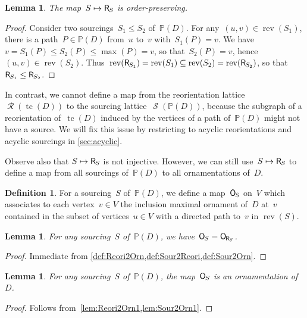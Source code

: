 \documentclass{amsart}
\newtheorem{lemma}[theorem]{Lemma}
\theoremstyle{definition}
\newtheorem{definition}[theorem]{Definition}
\renewcommand{\c}[1]{\mathcal{#1}} %
\DeclareMathOperator{\tc}{tc} %
\newcommand{\mymap}[2]{\mathsf{#1}_{\hspace{-.7pt}#2}}
\newcommand{\orn}[1]{\mymap{O}{#1}}  %
\DeclareMathOperator{\Reori}{\c{R}}  %
\newcommand{\reori}[1]{\mymap{R}{#1}}  %
\DeclareMathOperator{\rev}{rev} %
\DeclareMathOperator{\Sour}{\mathcal{S}}  %
\newcommand{\PP}{\mathbb P} %
\begin{document}
\begin{lemma}
\label{lem:Sour2Reori}
The map~$S \mapsto \reori{S}$ is order-preserving.
\end{lemma}

\begin{proof}
Consider two sourcings~$S_1 \le S_2$ of~$\PP(D)$.
For any~$(u,v) \in \rev(S_1)$, there is a path~$P \in \PP(D)$ from~$u$ to~$v$ with~$S_1(P) = v$.
We have~$v = S_1(P) \le S_2(P) \le \max(P) = v$, so that~$S_2(P) = v$, hence~$(u,v) \in \rev(S_2)$.
Thus~$\rev(\reori{S_1}) = \rev(S_1) \subseteq \rev(S_2) = \rev(\reori{S_2})$, so that~${\reori{S_1} \le \reori{S_2}}$.
\end{proof}

In contrast, we cannot define a map from the reorientation lattice~$\Reori(\tc(D))$ to the sourcing lattice~$\Sour(\PP(D))$, because the subgraph of a reorientation of~$\tc(D)$ induced by the vertices of a path of~$\PP(D)$ might not have a source.
We will fix this issue by restricting to acyclic reorientations and acyclic sourcings in \cref{sec:acyclic}.

Observe also that $S \mapsto \reori{S}$ is not injective.
However, we can still use~$S \mapsto \reori{S}$ to define a map from all sourcings of~$\PP(D)$ to all ornamentations of~$D$.

\begin{definition}
\label{def:Sour2Orn}
For a sourcing~$S$ of~$\PP(D)$, we define a map~$\orn{S}$ on~$V$ which associates to each vertex~$v \in V$ the inclusion maximal ornament of~$D$ at~$v$ contained in the subset of vertices~$u \in V$ with a directed path to~$v$ in $\rev(S)$.
\end{definition}

\begin{lemma}
\label{lem:Sour2Orn1}
For any sourcing~$S$ of~$\PP(D)$, we have~$\orn{S} = \orn{\reori{S}}$.
\end{lemma}

\begin{proof}
Immediate from \cref{def:Reori2Orn,def:Sour2Reori,def:Sour2Orn}.
\end{proof}

\begin{lemma}
\label{lem:Sour2Orn2}
For any sourcing~$S$ of~$\PP(D)$, the map~$\orn{S}$ is an ornamentation of~$D$.
\end{lemma}

\begin{proof}
Follows from~\cref{lem:Reori2Orn1,lem:Sour2Orn1}.
\end{proof}
\end{document}

